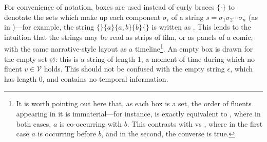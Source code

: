 \documentclass[a4paper,12pt,leqno]{article}
\newcommand{\vph}[1]{\vphantom{#1}}
\newcommand{\ebox}[1]{\fbox{$\vph{'(),}#1$}}
\newcommand{\V}{\mathcal{V}}
\renewcommand{\emptyset}{\varnothing}
\newcommand{\EventString}[1]{%
	\renewcommand*{\do}[1]{\ebox{##1}}%
	\PipeParser{#1}%
}
\begin{document}
For convenience of notation, boxes \ebox{\cdot} are used instead of curly braces $\{\cdot\}$ to denotate the sets which make up each component $\sigma_i$ of a string $s = \sigma_1\sigma_2\cdots\sigma_n$ (as in \citet{Fernando2004,fernando2015semantics,fernando2016prior,woods2017towards})---for example, the string $\{\}\{a\}\{a,b\}\{b\}\{\}$ is written as \EventString{{}|a|a,b|b|{}}. This lends to the intuition that the strings may be read as strips of film, or as panels of a comic, with the same narrative-style layout as a timeline\footnote{It is worth pointing out here that, as each box is a set, the order of fluents appearing in it is immaterial---for instance, \EventString{a,b} is exactly equivalent to \EventString{b,a}, where in both cases, $a$ is co-occurring with $b$. This contrasts with \EventString{a|b} vs \EventString{b|a}, where in the first case $a$ is occurring before $b$, and in the second, the converse is true.}. An empty box \ebox{} is drawn for the empty set $\emptyset$: this is a string of length 1, a moment of time during which no fluent $v \in \V$ holds. This should not be confused with the empty string $\epsilon$, which has length 0, and contains no temporal information.
\end{document}
